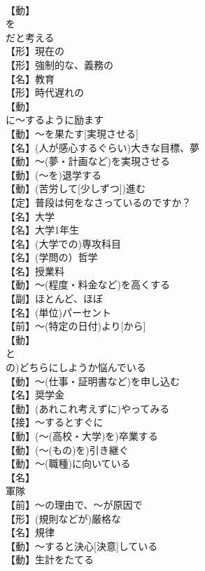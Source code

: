 \documentclass[8pt]{extreport}
\begin{document}
\begin{CJK}{UTF8}{min}
\\	【動】
\\	を
\\	だと考える
\\	【形】現在の
\\	【形】強制的な、義務の
\\	【名】教育
\\	【形】時代遅れの
\\	【動】
\\	に～するように励ます
\\	【動】～を果たす[実現させる]
\\	【名】(人が感心するぐらい)大きな目標、夢
\\	【動】～(夢・計画など)を実現させる
\\	【動】(～を)退学する
\\	【動】(苦労して[少しずつ])進む
\\	【定】普段は何をなさっているのですか？
\\	【名】大学
\\	【名】大学1年生
\\	【名】(大学での)専攻科目
\\	【名】(学問の）哲学
\\	【名】授業料
\\	【動】～(程度・料金など)を高くする
\\	【副】ほとんど、ほぼ
\\	【名】(単位)パーセント
\\	【前】～(特定の日付)より[から]
\\	【動】
\\	と
\\	の)どちらにしようか悩んでいる
\\	【動】～(仕事・証明書など)を申し込む
\\	【名】奨学金
\\	【動】(あれこれ考えずに)やってみる
\\	【接】～するとすぐに
\\	【動】(～(高校・大学)を)卒業する
\\	【動】(～(もの)を)引き継ぐ
\\	【動】～(職種)に向いている
\\	【名】
\\	軍隊
\\	【前】～の理由で、～が原因で
\\	【形】(規則などが)厳格な
\\	【名】規律
\\	【動】～すると決心[決意]している
\\	【動】生計をたてる

\end{CJK}
\end{document}
